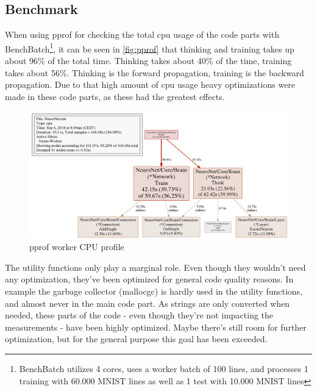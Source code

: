 \documentclass[11pt]{article}
\begin{document}
\newpage
\subsection{Benchmark}
When using pprof for checking the total cpu usage of the code parts with BenchBatch\footnote{BenchBatch utilizes 4 cores, uses a worker batch of 100 lines, and processes 1 training with 60.000 MNIST lines as well as 1 test with 10.000 MNIST lines}, it can be seen in \autoref{fig:pprof} that thinking and training takes up about 96\% of the total time. Thinking takes about 40\% of the time, training takes about 56\%. Thinking is the forward propagation, training is the backward propagation. Due to that high amount of cpu usage heavy optimizations were made in these code parts, as these had the greatest effects.
\begin{figure}[H]
	\centering
	\includegraphics[width=1.0\textwidth]{./Data/Final/Images/pprof.png}
	\vspace{-1em}
	\caption{pprof worker CPU profile}
	\vspace{-0.5em}
	\label{fig:pprof}
\end{figure}

The utility functions only play a marginal role. Even though they wouldn't need any optimization, they've been optimized for general code quality reasons. In example the garbage collector (mallocgc) is hardly used in the utility functions, and almost never in the main code part. As strings are only converted when needed, these parts of the code - even though they're not impacting the measurements - have been highly optimized. Maybe there's still room for further optimization, but for the general purpose this goal has been exceeded.
\end{document}
